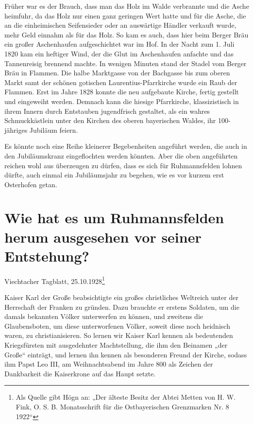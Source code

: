 \documentclass[12pt,a4paper]{book}
\begin{document}
Früher war es der Brauch, dass man das Holz im Walde verbrannte und die
Asche heimfuhr, da das Holz nur einen ganz geringen Wert hatte und für
die Asche, die an die einheimischen Seifensieder oder an auswärtige
Händler verkauft wurde, mehr Geld einnahm als für das Holz. So kam es
auch, dass hier beim Berger Bräu ein großer Aschenhaufen aufgeschichtet
war im Hof. In der Nacht zum 1. Juli 1820 kam ein heftiger Wind, der die
Glut im Aschenhaufen anfachte und das Tannenreisig brennend machte. In
wenigen Minuten stand der Stadel vom Berger Bräu in Flammen. Die halbe
Marktgasse von der Bachgasse bis zum oberen Markt samt der schönen
gotischen Laurentius-Pfarrkirche wurde ein Raub der Flammen. Erst im
Jahre 1828 konnte die neu aufgebaute Kirche, fertig gestellt und
eingeweiht werden. Demnach kann die hiesige Pfarrkirche, klassizistisch
in ihrem Innern durch Entstauben jugendfrisch gestaltet, als ein wahres
Schmuckkästlein unter den Kirchen des oberen bayerischen Waldes, ihr
100-jähriges Jubiläum feiern.

Es könnte noch eine Reihe kleinerer Begebenheiten angeführt werden, die
auch in den Jubiläumskranz eingeflochten werden könnten. Aber die oben
angeführten reichen wohl aus überzeugen zu dürfen, dass es sich für
Ruhmannsfelden lohnen dürfte, auch einmal ein Jubiläumsjahr zu begehen,
wie es vor kurzem erst Osterhofen getan.

\chapter[Ruhmannsfelden vor seiner Entstehung]{Wie hat es um
Ruhmannsfelden herum ausgesehen vor seiner Entstehung?}

Viechtacher Tagblatt, 25.10.1928\footnote{Als Quelle gibt Högn an: „Der
älteste Besitz der Abtei Metten von H. W. Fink, O. S. B. Monatsschrift
für die Ostbayerischen Grenzmarken Nr. 8 1922“}

Kaiser Karl der Große beabsichtigte ein großes christliches Weltreich
unter der Herrschaft der Franken zu gründen. Dazu brauchte er erstens
Soldaten, um die damals bekannten Völker unterwerfen zu können, und
zweitens die Glaubensboten, um diese unterworfenen Völker, soweit diese
noch heidnisch waren, zu christianisieren. So lernen wir Kaiser Karl
kennen als bedeutenden Kriegsfürsten mit ausgedehnter Machtstellung, die
ihm den Beinamen „der Große“ einträgt, und lernen ihn kennen als
besonderen Freund der Kirche, sodass ihm Papst Leo III, am
Weihnachtsabend im Jahre 800 als Zeichen der Dankbarkeit die Kaiserkrone
auf das Haupt setzte.
\end{document}
